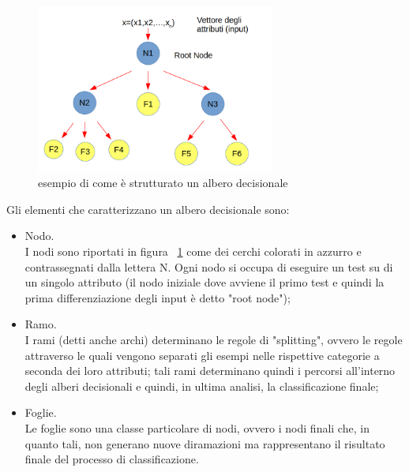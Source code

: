 \begin{figure} [h!]
	\centering
	\includegraphics[width=0.70\textwidth]{figs/schemaDT.png}
	\caption{esempio di come è strutturato un albero decisionale}
	\label{schemaDT}
\end{figure} 

Gli elementi che caratterizzano un albero decisionale sono:
\begin{itemize}
	\item Nodo. \\
	I nodi sono riportati in figura ~\ref{schemaDT} come dei cerchi colorati in azzurro e contrassegnati dalla lettera N. Ogni nodo si occupa di eseguire un test su di un singolo attributo (il nodo iniziale dove avviene il primo test e quindi la prima differenziazione degli input è detto "root node");
	\item Ramo. \\
	I rami (detti anche archi) determinano le regole di "splitting", ovvero le regole attraverso le quali vengono separati gli esempi nelle rispettive categorie a seconda dei loro attributi; tali rami determinano quindi i percorsi all'interno degli alberi decisionali e quindi, in ultima analisi, la classificazione finale;
	\item Foglie. \\
	Le foglie sono una classe particolare di nodi, ovvero i nodi finali che, in quanto tali, non generano nuove diramazioni ma rappresentano il risultato finale del processo di classificazione.
\end{itemize}

